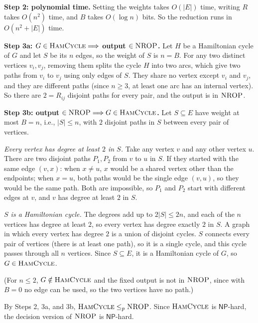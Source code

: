 \documentclass[11pt]{article}
\newcommand{\abs}[1]{\left|#1\right|}
\newcommand{\lp}{\leq_p}
\newcommand{\cproblem}[1]{\textsc{#1}}
\newcommand{\NP}{\textsf{NP}}
\newcommand{\HC}{\cproblem{HamCycle}}
\newcommand{\NROP}{\cproblem{NROP}}
\begin{document}
\textbf{Step 2: polynomial time.}
Setting the weights takes $O(\abs{E})$ time, writing $R$ takes $O(n^2)$ time, and $B$ takes $O(\log n)$ bits.
So the reduction runs in $O(n^2 + \abs{E})$ time.

\textbf{Step 3a: $G \in \HC \Longrightarrow$ output $\in \NROP$.}
Let $H$ be a Hamiltonian cycle of $G$ and let $S$ be its $n$ edges, so the weight of $S$ is $n = B$.
For any two distinct vertices $v_i, v_j$, removing them splits the cycle $H$ into two arcs, which give two paths from $v_i$ to $v_j$ using only edges of $S$.
They share no vertex except $v_i$ and $v_j$, and they are different paths (since $n \geq 3$, at least one arc has an internal vertex).
So there are $2 = R_{ij}$ disjoint paths for every pair, and the output is in $\NROP$.

\textbf{Step 3b: output $\in \NROP \Longrightarrow G \in \HC$.}
Let $S \subseteq E$ have weight at most $B = n$, i.e., $\abs{S} \leq n$, with $2$ disjoint paths in $S$ between every pair of vertices.

\emph{Every vertex has degree at least $2$ in $S$.}
Take any vertex $v$ and any other vertex $u$.
There are two disjoint paths $P_1, P_2$ from $v$ to $u$ in $S$.
If they started with the same edge $(v, x)$: when $x \neq u$, $x$ would be a shared vertex other than the endpoints; when $x = u$, both paths would be the single edge $(v, u)$, so they would be the same path.
Both are impossible, so $P_1$ and $P_2$ start with different edges at $v$, and $v$ has degree at least $2$ in $S$.

\emph{$S$ is a Hamiltonian cycle.}
The degrees add up to $2\abs{S} \leq 2n$, and each of the $n$ vertices has degree at least $2$, so every vertex has degree exactly $2$ in $S$.
A graph in which every vertex has degree $2$ is a union of disjoint cycles.
$S$ connects every pair of vertices (there is at least one path), so it is a single cycle, and this cycle passes through all $n$ vertices.
Since $S \subseteq E$, it is a Hamiltonian cycle of $G$, so $G \in \HC$.

(For $n \leq 2$, $G \notin \HC$ and the fixed output is not in $\NROP$, since with $B = 0$ no edge can be used, so the two vertices have no path.)

By Steps 2, 3a, and 3b, $\HC \lp \NROP$.
Since $\HC$ is $\NP$-hard, the decision version of $\NROP$ is $\NP$-hard.
\end{document}
